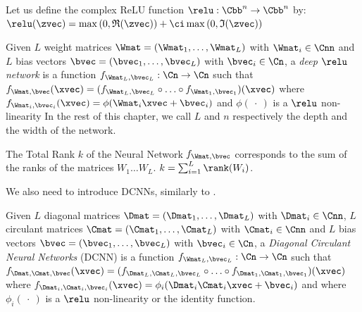 \begin{definition}
Let us define the complex ReLU function $\relu: \Cbb^n \rightarrow \Cbb^n$ by: $\relu(\zvec)= \max\left(0, \mathfrak{R}(\zvec)\right) + \ci \max\left(0, \mathfrak{I}(\zvec) \right)$
\label{definition:relu_function}
\end{definition}

\begin{definition} \label{definition:deep_relu_network}
Given $L$ weight matrices $\Wmat = (\Wmat_1, \ldots, \Wmat_L)$ with $\Wmat_i \in \Cnn$ and  $L$ bias vectors $\bvec = (\bvec_1, \ldots, \bvec_L)$  with  $\bvec_i \in \Cn$, a \emph{deep $\relu$ network} is a function $f_{\Wmat_L, \bvec_L} : \Cn \rightarrow \Cn$ such that $f_{\Wmat, \bvec}(\xvec) =  (f_{\Wmat_L, \bvec_L} \circ \ldots \circ f_{\Wmat_1, \bvec_1})(\xvec)$ where $f_{\Wmat_i, \bvec_i}(\xvec) = \phi(\Wmat_i \xvec + \bvec_i)$ and $\phi(\ \cdot\ )$ is a $\relu$ non-linearity 
In the rest of this chapter, we call $L$ and $n$ respectively the depth and the width of the network.
\end{definition}

\begin{definition}
  The Total Rank $k$ of the Neural Network $f_{\Wmat, \bvec}$ corresponds to the sum of the ranks of the matrices $W_{1}\ldots W_{L}$. \ie $k = \sum_{i=1}^L \rank(W_i)$.
\end{definition}


We also need to introduce DCNNs, similarly to \citet{moczulski2015acdc}.

\begin{definition} \label{definition:DCNN}
Given $L$ diagonal matrices $\Dmat = (\Dmat_1, \ldots, \Dmat_L)$ with $\Dmat_i \in \Cnn$, $L$ circulant matrices $\Cmat = (\Cmat_1, \ldots, \Cmat_L)$ with $\Cmat_i \in \Cnn$ and $L$ bias vectors $\bvec = (\bvec_1, \ldots, \bvec_L)$ with  $\bvec_i \in \Cn$, a \emph{Diagonal Circulant Neural Networks} (DCNN) is a function $f_{\Wmat_L, \bvec_L} : \Cn \rightarrow \Cn$ such that $f_{\Dmat,\Cmat,\bvec}(\xvec) = (f_{\Dmat_L, \Cmat_L, \bvec_L} \circ \ldots \circ f_{\Dmat_1, \Cmat_1, \bvec_1})(\xvec)$ where $f_{\Dmat_i, \Cmat_i, \bvec_i}(\xvec) = \phi_i (\Dmat_i \Cmat_i \xvec + \bvec_i)$ and where $\phi_i(\ \cdot\ )$ is a $\relu$ non-linearity or the identity function.
\end{definition}

